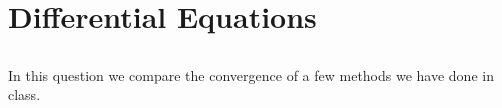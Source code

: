 
\chapter{Differential Equations}

\section{}
In this question we compare the convergence of a few methods we have done in class.